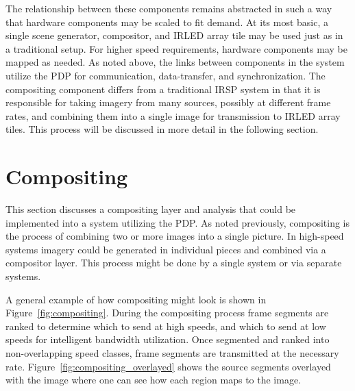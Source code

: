     The relationship between these components remains abstracted in such a way that hardware components may be scaled to fit demand. At its most basic, a single scene generator, compositor, and IRLED array tile may be used just as in a traditional setup. For higher speed requirements, hardware components may be mapped as needed. As noted above, the links between components in the system utilize the PDP for communication, data-transfer, and synchronization. The compositing component differs from a traditional IRSP system in that it is responsible for taking imagery from many sources, possibly at different frame rates, and combining them into a single image for transmission to IRLED array tiles. This process will be discussed in more detail in the following section.

\section{Compositing}
    \label{sec:compositing}
    This section discusses a compositing layer and analysis that could be implemented into a system utilizing the PDP. As noted previously, compositing is the process of combining two or more images into a single picture. In high-speed systems imagery could be generated in individual pieces and combined via a compositor layer. This process might be done by a single system or via separate systems.

    A general example of how compositing might look is shown in Figure~\ref{fig:compositing}. During the compositing process frame segments are ranked to determine which to send at high speeds, and which to send at low speeds for intelligent bandwidth utilization. Once segmented and ranked into non-overlapping speed classes, frame segments are transmitted at the necessary rate. Figure~\ref{fig:compositing_overlayed} shows the source segments overlayed with the image where one can see how each region maps to the image.

